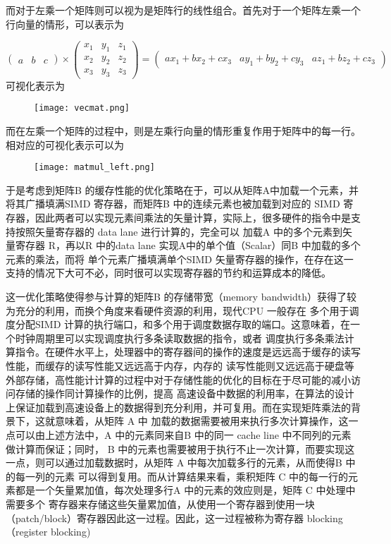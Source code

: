 而对于左乘一个矩阵则可以视为是矩阵行的线性组合。首先对于一个矩阵左乘一个行向量的情形，可以表示为

\begin{equation}
  \begin{pmatrix}
    a & b & c
  \end{pmatrix}
  \times
  \begin{pmatrix}
    x_1 & y_1 & z_1 \\
    x_2 & y_2 & z_2 \\
    x_3 & y_3 & z_3 
  \end{pmatrix}
  = 
  \begin{pmatrix}
    ax_1 + bx_2 + cx_3 & ay_1 + by_2 + cy_3 & az_1 + bz_2 + cz_3
  \end{pmatrix}
\end{equation}
可视化表示为

\begin{figure}
  \texttt{[image: vecmat.png]}
\end{figure}

而在左乘一个矩阵的过程中，则是左乘行向量的情形重复作用于矩阵中的每一行。相对应的可视化表示可以为

\begin{figure}
  \texttt{[image: matmul\_left.png]}
\end{figure}

于是考虑到矩阵B 的缓存性能的优化策略在于，可以从矩阵A中加载一个元素，并将其广播填满SIMD 寄存器，而矩阵B 中的连续元素也被加载到对应的
SIMD 寄存器，因此两者可以实现元素间乘法的矢量计算，实际上，很多硬件的指令中是支持按照矢量寄存器的 data lane 进行计算的，完全可以
加载A 中的多个元素到矢量寄存器 R，再以R 中的data lane 实现A中的单个值（Scalar）同B 中加载的多个元素的乘法，而将
单个元素广播填满单个SIMD 矢量寄存器的操作，在存在这一支持的情况下大可不必，同时很可以实现寄存器的节约和运算成本的降低。

这一优化策略使得参与计算的矩阵B 的存储带宽（memory bandwidth）获得了较为充分的利用，而换个角度来看硬件资源的利用，现代CPU 一般存在
多个用于调度分配SIMD 计算的执行端口，和多个用于调度数据存取的端口。这意味着，在一个时钟周期里可以实现调度执行多条读取数据的指令，或者
调度执行多条乘法计算指令。在硬件水平上，处理器中的寄存器间的操作的速度是远远高于缓存的读写性能，而缓存的读写性能又远远高于内存，内存的
读写性能则又远远高于硬盘等外部存储，高性能计计算的过程中对于存储性能的优化的目标在于尽可能的减小访问存储的操作同计算操作的比例，提高
高速设备中数据的利用率，在算法的设计上保证加载到高速设备上的数据得到充分利用，并可复用。而在实现矩阵乘法的背景下，这就意味着，从矩阵 A 中
加载的数据需要被用来执行多次计算操作，这一点可以由上述方法中，A 中的元素同来自B 中的同一 cache line 中不同列的元素做计算而保证；同时，
B 中的元素也需要被用于执行不止一次计算，而要实现这一点，则可以通过加载数据时，从矩阵 A 中每次加载多行的元素，从而使得B 中的每一列的元素
可以得到复用。而从计算结果来看，乘积矩阵 C 中的每一行的元素都是一个矢量累加值，每次处理多行A 中的元素的效应则是，矩阵 C 中处理中需要多个
寄存器来存储这些矢量累加值，从使用一个寄存器到使用一块（patch/block）寄存器因此这一过程。因此，这一过程被称为寄存器 blocking （register blocking)

